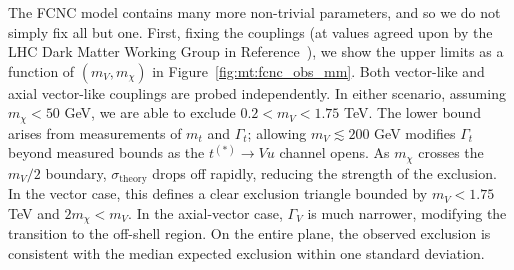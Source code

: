 The FCNC model contains many more non-trivial parameters, and so we do not simply fix all but one.
First, fixing the couplings (at values agreed upon by the LHC Dark Matter Working Group in Reference~\cite{lhcdmwg}), we show the upper limits as a function of $(m_V,m_\chi)$ in Figure~\ref{fig:mt:fcnc_obs_mm}.
Both vector-like and axial vector-like couplings are probed independently. 
In either scenario, assuming $m_\chi < 50$ GeV, we are able to exclude $0.2 < m_V < 1.75$ TeV.
The lower bound arises from measurements of $m_t$ and $\Gamma_t$; allowing $m_V \lesssim 200$ GeV modifies $\Gamma_t$ beyond measured bounds as the $t^{(*)} \rightarrow V u$ channel opens. 
As $m_\chi$ crosses the $m_V/2$ boundary, $\sigma_\mathrm{theory}$ drops off rapidly, reducing the strength of the exclusion.
In the vector case, this defines a clear exclusion triangle bounded by $m_V < 1.75$ TeV and $2m_\chi < m_V$.
In the axial-vector case, $\Gamma_V$ is much narrower, modifying the transition to the off-shell region. 
On the entire plane, the observed exclusion is consistent with the median expected exclusion within one standard deviation. 


